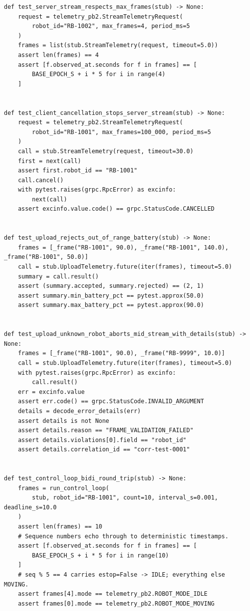 \begin{verbatim}
def test_server_stream_respects_max_frames(stub) -> None:
    request = telemetry_pb2.StreamTelemetryRequest(
        robot_id="RB-1002", max_frames=4, period_ms=5
    )
    frames = list(stub.StreamTelemetry(request, timeout=5.0))
    assert len(frames) == 4
    assert [f.observed_at.seconds for f in frames] == [
        BASE_EPOCH_S + i * 5 for i in range(4)
    ]


def test_client_cancellation_stops_server_stream(stub) -> None:
    request = telemetry_pb2.StreamTelemetryRequest(
        robot_id="RB-1001", max_frames=100_000, period_ms=5
    )
    call = stub.StreamTelemetry(request, timeout=30.0)
    first = next(call)
    assert first.robot_id == "RB-1001"
    call.cancel()
    with pytest.raises(grpc.RpcError) as excinfo:
        next(call)
    assert excinfo.value.code() == grpc.StatusCode.CANCELLED


def test_upload_rejects_out_of_range_battery(stub) -> None:
    frames = [_frame("RB-1001", 90.0), _frame("RB-1001", 140.0), _frame("RB-1001", 50.0)]
    call = stub.UploadTelemetry.future(iter(frames), timeout=5.0)
    summary = call.result()
    assert (summary.accepted, summary.rejected) == (2, 1)
    assert summary.min_battery_pct == pytest.approx(50.0)
    assert summary.max_battery_pct == pytest.approx(90.0)


def test_upload_unknown_robot_aborts_mid_stream_with_details(stub) -> None:
    frames = [_frame("RB-1001", 90.0), _frame("RB-9999", 10.0)]
    call = stub.UploadTelemetry.future(iter(frames), timeout=5.0)
    with pytest.raises(grpc.RpcError) as excinfo:
        call.result()
    err = excinfo.value
    assert err.code() == grpc.StatusCode.INVALID_ARGUMENT
    details = decode_error_details(err)
    assert details is not None
    assert details.reason == "FRAME_VALIDATION_FAILED"
    assert details.violations[0].field == "robot_id"
    assert details.correlation_id == "corr-test-0001"


def test_control_loop_bidi_round_trip(stub) -> None:
    frames = run_control_loop(
        stub, robot_id="RB-1001", count=10, interval_s=0.001, deadline_s=10.0
    )
    assert len(frames) == 10
    # Sequence numbers echo through to deterministic timestamps.
    assert [f.observed_at.seconds for f in frames] == [
        BASE_EPOCH_S + i * 5 for i in range(10)
    ]
    # seq % 5 == 4 carries estop=False -> IDLE; everything else MOVING.
    assert frames[4].mode == telemetry_pb2.ROBOT_MODE_IDLE
    assert frames[0].mode == telemetry_pb2.ROBOT_MODE_MOVING
\end{verbatim}

